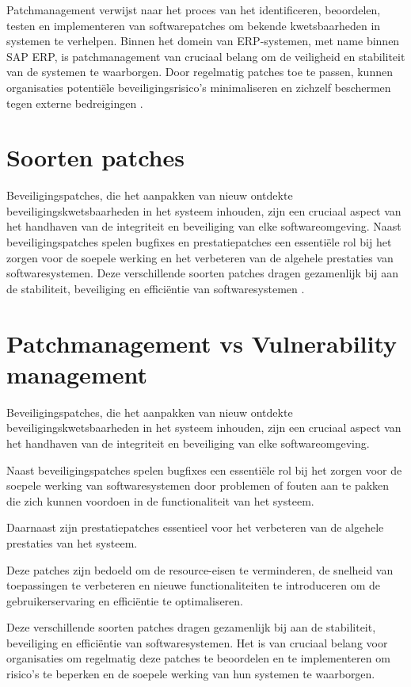 Patchmanagement verwijst naar het proces van het identificeren, beoordelen, testen en implementeren van softwarepatches om bekende kwetsbaarheden in systemen te verhelpen. Binnen het domein van ERP-systemen, met name binnen SAP ERP, is patchmanagement van cruciaal belang om de veiligheid en stabiliteit van de systemen te waarborgen. Door regelmatig patches toe te passen, kunnen organisaties potentiële beveiligingsrisico's minimaliseren en zichzelf beschermen tegen externe bedreigingen \autocite{Buenning2024}.

\section{Soorten patches}
Beveiligingspatches, die het aanpakken van nieuw ontdekte beveiligingskwetsbaarheden in het systeem inhouden, zijn een cruciaal aspect van het handhaven van de integriteit en beveiliging van elke softwareomgeving. Naast beveiligingspatches spelen bugfixes en prestatiepatches een essentiële rol bij het zorgen voor de soepele werking en het verbeteren van de algehele prestaties van softwaresystemen. Deze verschillende soorten patches dragen gezamenlijk bij aan de stabiliteit, beveiliging en efficiëntie van softwaresystemen \autocite{Wrobel2023}.

\section{Patchmanagement vs Vulnerability management}
Beveiligingspatches, die het aanpakken van nieuw ontdekte beveiligingskwetsbaarheden in het systeem inhouden, zijn een cruciaal aspect van het handhaven van de integriteit en beveiliging van elke softwareomgeving.

Naast beveiligingspatches spelen bugfixes een essentiële rol bij het zorgen voor de soepele werking van softwaresystemen door problemen of fouten aan te pakken die zich kunnen voordoen in de functionaliteit van het systeem.

Daarnaast zijn prestatiepatches essentieel voor het verbeteren van de algehele prestaties van het systeem.

Deze patches zijn bedoeld om de resource-eisen te verminderen, de snelheid van toepassingen te verbeteren en nieuwe functionaliteiten te introduceren om de gebruikerservaring en efficiëntie te optimaliseren.

Deze verschillende soorten patches dragen gezamenlijk bij aan de stabiliteit, beveiliging en efficiëntie van softwaresystemen. Het is van cruciaal belang voor organisaties om regelmatig deze patches te beoordelen en te implementeren om risico's te beperken en de soepele werking van hun systemen te waarborgen.

